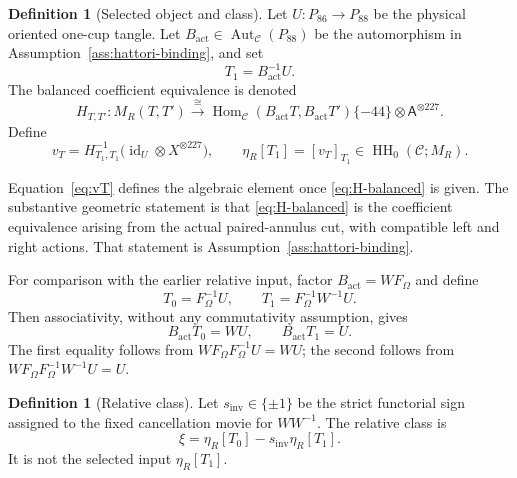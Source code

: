 \documentclass[10pt,reqno]{amsart}
\theoremstyle{definition}
\newtheorem{definition}[theorem]{Definition}
\theoremstyle{remark}
\newcommand{\HH}{\operatorname{HH}}
\newcommand{\id}{\operatorname{id}}
\newcommand{\Aut}{\operatorname{Aut}}
\begin{document}
\begin{definition}[Selected object and class]\label{def:vT}
Let $U:P_{86}\to P_{88}$ be the physical oriented one-cup tangle.  Let
$B_{\mathrm{act}}\in\Aut_{\mathcal C}(P_{88})$ be the automorphism in
Assumption~\ref{ass:hattori-binding}, and set
\begin{equation}\label{eq:T1}
T_1=B_{\mathrm{act}}^{-1}U.
\end{equation}
The balanced coefficient equivalence is denoted
\begin{equation}\label{eq:H-balanced}
H_{T,T'}:M_R(T,T')\xrightarrow{\cong}
\operatorname{Hom}_{\mathcal C}(B_{\mathrm{act}}T,B_{\mathrm{act}}T')
\{-44\}\otimes\mathsf A^{\otimes227}.
\end{equation}
Define
\begin{equation}\label{eq:vT}
v_T=H_{T_1,T_1}^{-1}
\bigl(\id_U\otimes X^{\otimes227}\bigr),
\qquad
\eta_R[T_1]=[v_T]_{T_1}\in\HH_0(\mathcal C;M_R).
\end{equation}
\end{definition}

Equation~\eqref{eq:vT} defines the algebraic element once
\cref{eq:H-balanced} is given.  The substantive geometric statement is that
\cref{eq:H-balanced} is the coefficient equivalence arising from the actual
paired-annulus cut, with compatible left and right actions.  That statement is
Assumption~\ref{ass:hattori-binding}.

For comparison with the earlier relative input, factor
$B_{\mathrm{act}}=WF_\Omega$ and define
\begin{equation}\label{eq:T0T1-factor}
T_0=F_\Omega^{-1}U,\qquad
T_1=F_\Omega^{-1}W^{-1}U.
\end{equation}
Then associativity, without any commutativity assumption, gives
\begin{equation}\label{eq:BT0BT1}
B_{\mathrm{act}}T_0=WU,\qquad B_{\mathrm{act}}T_1=U.
\end{equation}
The first equality follows from
$WF_\Omega F_\Omega^{-1}U=WU$; the second follows from
$WF_\Omega F_\Omega^{-1}W^{-1}U=U$.

\begin{definition}[Relative class]\label{def:xi}
Let $s_{\mathrm{inv}}\in\{\pm1\}$ be the strict functorial sign assigned to
the fixed cancellation movie for $WW^{-1}$.  The relative class is
\begin{equation}\label{eq:xi}
\xi=\eta_R[T_0]-s_{\mathrm{inv}}\eta_R[T_1].
\end{equation}
It is not the selected input $\eta_R[T_1]$.
\end{definition}
\end{document}
